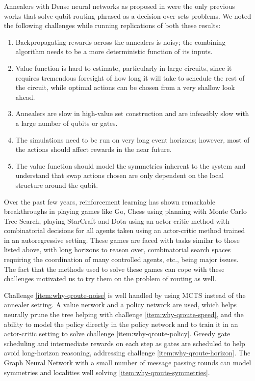 Annealers with Dense neural networks as proposed in \cite{qroute_dqn1,qroute_dqn2} were the only previous works that solve qubit routing phrased as a decision over sets problems. We noted the following challenges while running replications of both these results:
\begin{enumerate}
    \item\label{item:why-qroute-noise} Backpropagating rewards across the annealers is noisy; the combining algorithm needs to be a more deterministic function of its inputs.
    \item\label{item:why-qroute-policy} Value function is hard to estimate, particularly in large circuits, since it requires tremendous foresight of how long it will take to schedule the rest of the circuit, while optimal actions can be chosen from a very shallow look ahead.
    \item\label{item:why-qroute-speed} Annealers are slow in high-value set construction and are infeasibly slow with a large number of qubits or gates.
    \item\label{item:why-qroute-horizon} The simulations need to be run on very long event horizons; however, most of the actions should affect rewards in the near future. 
    \item\label{item:why-qroute-symmetries} The value function should model the symmetries inherent to the system and understand that swap actions chosen are only dependent on the local structure around the qubit.
\end{enumerate}

Over the past few years, reinforcement learning has shown remarkable breakthroughs in playing games like Go\cite{mcts-alphago}, Chess\cite{mcts-alphazero} using planning with Monte Carlo Tree Search, playing StarCraft\cite{rl-alphastar-blog} and Dota\cite{rl-openai-dota} using an actor-critic method with combinatorial decisions for all agents taken using an actor-critic method trained in an autoregressive setting. These games are faced with tasks similar to those listed above, with long horizons to reason over, combinatorial search spaces requiring the coordination of many controlled agents, etc., being major issues. The fact that the methods used to solve these games can cope with these challenges motivated us to try them on the problem of routing as well.

Challenge \ref{item:why-qroute-noise} is well handled by using MCTS instead of the annealer setting. A value network and a policy network are used, which helps neurally prune the tree helping with challenge \ref{item:why-qroute-speed}, and the ability to model the policy directly in the policy network and to train it in an actor-critic setting to solve challenge \ref{item:why-qroute-policy}. Greedy gate scheduling and intermediate rewards on each step as gates are scheduled to help avoid long-horizon reasoning, addressing challenge \ref{item:why-qroute-horizon}. The Graph Neural Network with a small number of message passing rounds can model symmetries and localities well solving \ref{item:why-qroute-symmetries}.

